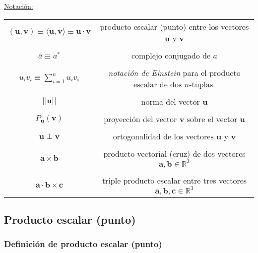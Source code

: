 \documentclass[12pt]{article}
\begin{document}
\vspace{1cm}

\begin{tcolorbox} \label{1:Notación}
\underline{Notación:}

\centering
\begin{tabular}{cc}
    \\
    $(\mathbf{u},\mathbf{v}) \equiv \langle\mathbf{u},\mathbf{v}\rangle \equiv \mathbf{u}\cdot\mathbf{v}$ & producto escalar (punto) entre los vectores $\mathbf{u}$ y $\mathbf{v}$ \\ \\
    $\overline{a} \equiv a^*$ & complejo conjugado de $a$ \\ \\
    $u_i v_i \equiv \sum_{i=1}^n u_i v_i$ & \textit{notación de Einstein} para el producto escalar de dos $n$-tuplas. \\ \\
    $||\mathbf{u}||$ & norma del vector $\mathbf{u}$ \\ \\
    $P_{\mathbf{u}}(\mathbf{v})$ & proyección del vector $\mathbf{v}$ sobre el vector $\mathbf{u}$ \\ \\
    $\mathbf{u}\perp\mathbf{v}$ & ortogonalidad de los vectores $\mathbf{u}$ y $\mathbf{v}$ \\ \\
    $\mathbf{a}\times\mathbf{b}$ & producto vectorial (cruz) de dos vectores $\mathbf{a},\mathbf{b}\in\mathbb{R}^3$ \\ \\
    $\mathbf{a}\cdot\mathbf{b}\times\mathbf{c}$ & triple producto escalar entre tres vectores $\mathbf{a},\mathbf{b},\mathbf{c}\in\mathbb{R}^3$ \\
\end{tabular}
\end{tcolorbox}


\newpage
\subsection{Producto escalar (punto)}

\subsubsection{Definición de producto escalar (punto)} \label{Def:Producto_escalar}
\end{document}
